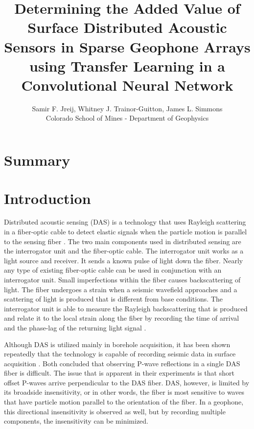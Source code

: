 

\title{Determining the Added Value of Surface Distributed Acoustic Sensors in Sparse Geophone Arrays using Transfer Learning in a Convolutional Neural Network}
\author{Samir F. Jreij, Whitney J. Trainor-Guitton, James L. Simmons \\Colorado School of Mines - Department of Geophysics}

\maketitle

\section{Summary}

\section{Introduction}
Distributed acoustic sensing (DAS) is a technology that uses Rayleigh scattering in a fiber-optic cable to detect elastic signals when the particle motion is parallel to the sensing fiber \citep{hornman2013field}. The two main components used in distributed sensing are the interrogator unit and the fiber-optic cable. The interrogator unit works as a light source and receiver. It sends a known pulse of light down the fiber. Nearly any type of existing fiber-optic cable can be used in conjunction with an interrogator unit. Small imperfections within the fiber causes backscattering of light. The fiber undergoes a strain when a seismic wavefield approaches and a scattering of light is produced that is different from base conditions. The interrogator unit is able to measure the Rayleigh backscattering that is produced and relate it to the local strain along the fiber by recording the time of arrival and the phase-lag of the returning light signal \citep{Parker2014}.

Although DAS is utilized mainly in borehole acquisition, it has been shown repeatedly that the technology is capable of recording seismic data in surface acquisition \citep{daley2013field,yavuz2016subsurface,jreij2018improving}. Both \citet{daley2013field,yavuz2016subsurface} concluded that observing P-wave reflections in a single DAS fiber is difficult. The issue that is apparent in their experiments is that short offset P-waves arrive perpendicular to the DAS fiber. DAS, however, is limited by its broadside insensitivity, or in other words, the fiber is most sensitive to waves that have particle motion parallel to the orientation of the fiber. In a geophone, this directional insensitivity is observed as well, but by recording multiple components, the insensitivity can be minimized.

